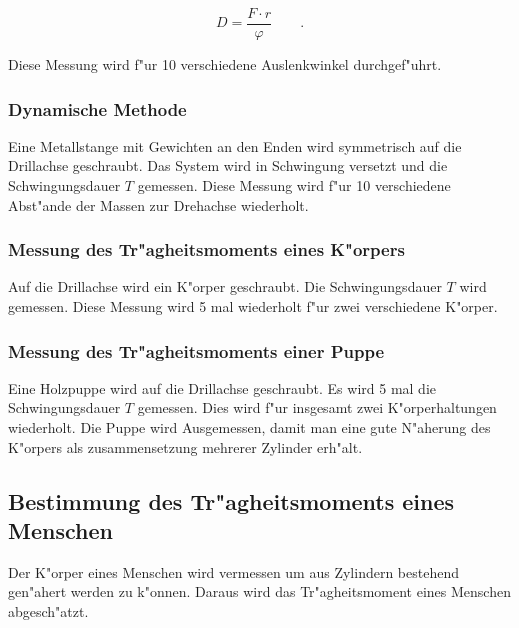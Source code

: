 \begin{equation}
 	D = \frac{F \cdot r}{\varphi} \qquad .
\end{equation} 

Diese Messung wird f"ur 10 verschiedene Auslenkwinkel durchgef"uhrt.

\subsubsection{Dynamische Methode} %
\label{sub:dynamische_methode}
 
Eine Metallstange mit Gewichten an den Enden wird symmetrisch auf die Drillachse geschraubt. Das System wird in Schwingung versetzt und die Schwingungsdauer $T$ gemessen. Diese Messung wird f"ur 10 verschiedene Abst"ande der Massen zur Drehachse wiederholt.

\subsubsection{Messung des Tr"agheitsmoments eines K"orpers} %
\label{sub:tr_agheitsmoment_verschiedener_k_orper}

Auf die Drillachse wird ein K"orper geschraubt.
Die Schwingungsdauer $T$ wird gemessen.
Diese Messung wird 5 mal wiederholt f"ur zwei verschiedene K"orper.

\subsubsection{Messung des Tr"agheitsmoments einer Puppe} %
\label{sub:messung_des_tr_agheitsmoments_einer_puppe}

Eine Holzpuppe wird auf die Drillachse geschraubt.
Es wird 5 mal die Schwingungsdauer $T$ gemessen.
Dies wird f"ur insgesamt zwei K"orperhaltungen wiederholt.
Die Puppe wird Ausgemessen, damit man eine gute N"aherung des K"orpers als zusammensetzung mehrerer Zylinder erh"alt.

\subsection{Bestimmung des Tr"agheitsmoments eines Menschen} %
\label{sub:bestimmung_des_tr_agheitsmoments_eines_menschen}

Der K"orper eines Menschen wird vermessen um aus Zylindern bestehend gen"ahert werden zu k"onnen. Daraus wird das Tr"agheitsmoment eines Menschen abgesch"atzt.